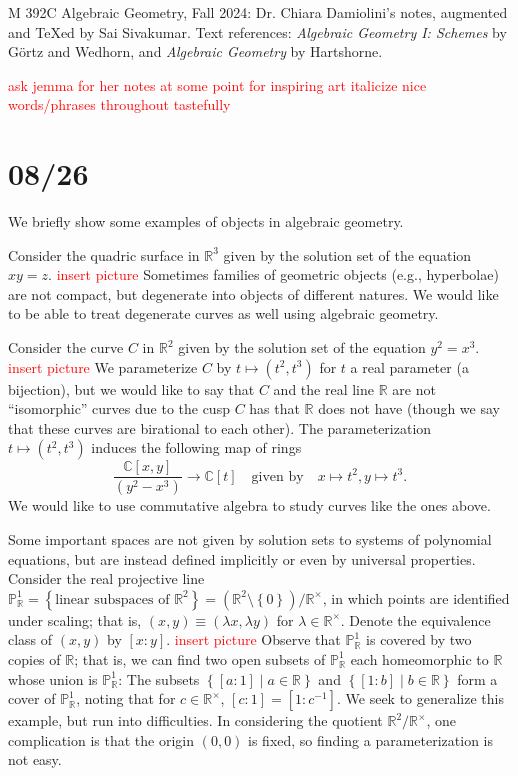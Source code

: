 \documentclass[11pt,leqno]{article}
\newcommand{\sai}[1]{\textcolor{red}{#1}}
\theoremstyle{plain}
\theoremstyle{definition}
\numberwithin{equation}{section}
\numberwithin{lem}{section}
\newcommand{\cbr}[1]{\left\{#1\right\}}
\begin{document}
M 392C Algebraic Geometry, Fall 2024: Dr. Chiara Damiolini's notes, augmented and \TeX ed by Sai Sivakumar. Text references: \textit{Algebraic Geometry I: Schemes} by G\"ortz and Wedhorn, and \textit{Algebraic Geometry} by Hartshorne.

\sai{ask jemma for her notes at some point for inspiring art}
\sai{italicize nice words/phrases throughout tastefully}
\section{08/26}
We briefly show some examples of objects in algebraic geometry.

Consider the quadric surface in $\mathbb R^3$ given by the solution set of the equation $xy = z$.
\sai{insert picture}
Sometimes families of geometric objects (e.g., hyperbolae) are not compact, but degenerate into objects of different natures.
We would like to be able to treat degenerate curves as well using algebraic geometry.

Consider the curve $C$ in $\mathbb R^2$ given by the solution set of the equation $y^2 = x^3$.
\sai{insert picture}
We parameterize $C$ by $t\mapsto (t^2,t^3)$ for $t$ a real parameter (a bijection), but we would like to say that $C$ and the real line $\mathbb R$ are not ``isomorphic'' curves due to the cusp $C$ has that $\mathbb R$ does not have (though we say that these curves are birational to each other). The parameterization $t\mapsto (t^2, t^3)$ induces the following map of rings
\begin{equation}
  \frac{\mathbb C[x,y]}{(y^2-x^3)}\to \mathbb C[t]\quad \text{given by}\quad  x\mapsto t^2, y\mapsto t^3.
\end{equation}
We would like to use commutative algebra to study curves like the ones above.

Some important spaces are not given by solution sets to systems of polynomial equations, but are instead defined implicitly or even by universal properties.
Consider the real projective line $\mathbb P_{\mathbb R}^1 = \cbr{\text{linear subspaces of }\mathbb R^2} = (\mathbb R^2\setminus\cbr{0})/\mathbb R^\times$, in which points are identified under scaling; that is, $(x,y)\equiv (\lambda x,\lambda y)$ for $\lambda\in \mathbb R^\times$. Denote the equivalence class of $(x,y)$ by $[x:y]$. \sai{insert picture}
Observe that $\mathbb P_{\mathbb R}^1$ is covered by two copies of $\mathbb R$; that is, we can find two open subsets of $\mathbb P_{\mathbb R}^1$ each homeomorphic to $\mathbb R$ whose union is $\mathbb P_{\mathbb R}^1$: The subsets $\cbr{[a:1]\mid a\in\mathbb R}$ and $\cbr{[1:b]\mid b\in \mathbb R}$ form a cover of $\mathbb P_{\mathbb R}^1$, noting that for $c\in\mathbb R^\times$, $[c:1] = [1:c^{-1}]$.
We seek to generalize this example, but run into difficulties. 
In considering the quotient $\mathbb R^2/\mathbb R^\times$, one complication is that the origin $(0,0)$ is fixed, so finding a parameterization is not easy.
\end{document}
